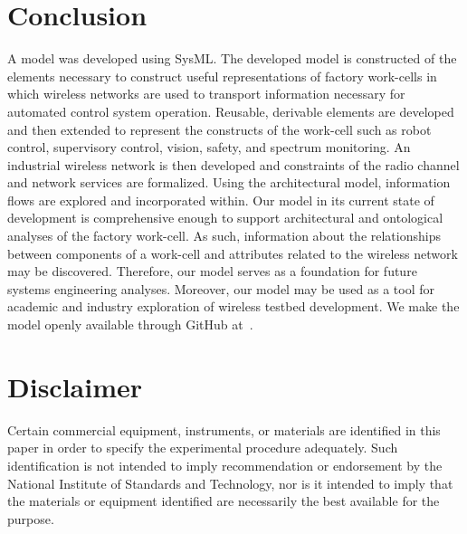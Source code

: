 \documentclass[journal, twoside]{IEEEtran}
\begin{document}
	\section{Conclusion}\label{sec:conclusion}
	A model was developed using SysML.  The developed model is constructed of the elements necessary to construct useful representations of factory work-cells in which wireless networks are used to transport information necessary for automated control system operation.  Reusable, derivable elements are developed and then extended to represent the constructs of the work-cell such as robot control, supervisory control, vision, safety, and spectrum monitoring.  An industrial wireless network is then developed and constraints of the radio channel and network services are formalized. Using the architectural model, information flows are explored and incorporated within. Our model in its current state of development is comprehensive enough to support architectural and ontological analyses of the factory work-cell.  As such, information about the relationships between components of a work-cell and attributes related to the wireless network may be discovered.  Therefore, our model serves as a foundation for future systems engineering analyses. Moreover, our model may be used as a tool for academic and industry exploration of wireless testbed development.  We make the model openly available through GitHub at~\cite{SysML.Candell2018}.
	
	\section*{Disclaimer}
	Certain commercial equipment, instruments, or materials are identified in this paper in order to specify the experimental procedure adequately. Such identification is not intended to imply recommendation or endorsement by the National Institute of Standards and Technology, nor is it intended to imply that the materials or equipment identified are necessarily the best available for the purpose.
	
	
	
	 
    
    
	
\end{document}

